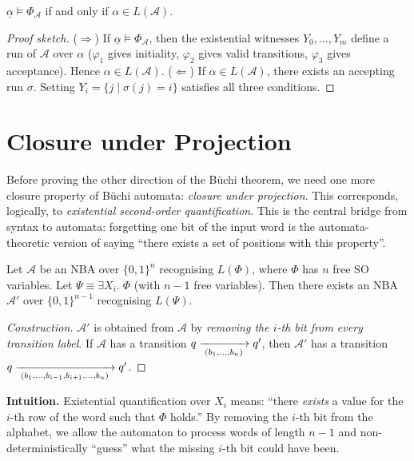 \begin{theorem}[Correctness]
$\underline{\alpha} \models \Phi_{\mathcal{A}}$ if and only if
$\alpha \in L(\mathcal{A})$.
\end{theorem}
\begin{proof}[Proof sketch]
($\Rightarrow$) If $\underline{\alpha} \models \Phi_{\mathcal{A}}$, then
the existential witnesses $Y_0, \ldots, Y_m$ define a run of $\mathcal{A}$
over $\alpha$ ($\varphi_1$ gives initiality, $\varphi_2$ gives valid
transitions, $\varphi_3$ gives acceptance).  Hence $\alpha \in
L(\mathcal{A})$.  ($\Leftarrow$) If $\alpha \in L(\mathcal{A})$, there
exists an accepting run $\sigma$.  Setting $Y_i = \{j \mid \sigma(j) = i\}$
satisfies all three conditions.
\end{proof}

\section{Closure under Projection}
\label{sec:closure-projection}

Before proving the other direction of the Büchi theorem, we need one more
closure property of Büchi automata: \emph{closure under projection}.  This
corresponds, logically, to \emph{existential second-order quantification}.
This is the central bridge from syntax to automata: forgetting one bit of
the input word is the automata-theoretic version of saying ``there exists a
set of positions with this property''.

\begin{lemma}
\label{lem:projection}
Let $\mathcal{A}$ be an NBA over $\{0,1\}^n$ recognising $L(\Phi)$,
where $\Phi$ has $n$ free SO variables.  Let $\Psi \equiv \exists X_i.\;\Phi$
(with $n-1$ free variables).  Then there exists an NBA $\mathcal{A}'$ over
$\{0,1\}^{n-1}$ recognising $L(\Psi)$.
\end{lemma}

\begin{proof}[Construction]
$\mathcal{A}'$ is obtained from $\mathcal{A}$ by \emph{removing the
$i$-th bit from every transition label}.  If $\mathcal{A}$ has a
transition $q \xrightarrow[{\;(b_1,\ldots,b_n)\;}]{} q'$, then $\mathcal{A}'$
has a transition $q \xrightarrow[{\;(b_1,\ldots,b_{i-1},b_{i+1},\ldots,b_n)\;}]{} q'$.
\end{proof}

\medskip\noindent
\textbf{Intuition.}  Existential quantification over $X_i$ means: ``there
\emph{exists} a value for the $i$-th row of the word such that $\Phi$
holds.''  By removing the $i$-th bit from the alphabet, we allow the
automaton to process words of length $n-1$ and non-deterministically
``guess'' what the missing $i$-th bit could have been.


